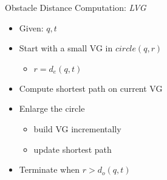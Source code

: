 \begin{frame}{Obstacle Distance Computation: \textit{LVG}}
\begin{minipage}{.4\textwidth}
\begin{itemize}
\item \small Given: $q, t$
\item \small Start with a small VG in $circle(q, r)$
\begin{itemize}
    \item \small $r=d_e(q,t)$
\end{itemize}
\item \small Compute shortest path on current VG
\item \small Enlarge the circle 
    \begin{itemize}
        \item \small build VG incrementally
        \item \small update shortest path
    \end{itemize}
\item \small Terminate when $r>d_o(q, t)$
\end{itemize}
\end{minipage}%
\begin{minipage}{.6\textwidth}
\begin{adjustbox}{max totalsize={.9\textwidth}{.9\textheight}, right}
    \only<1>{}
    \only<2,3>{}
    \only<4>{}
\end{adjustbox}
\end{minipage}
\end{frame}